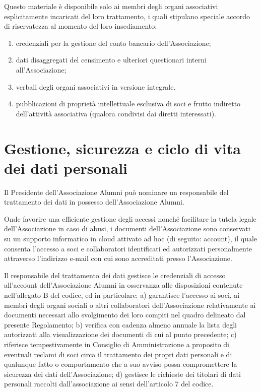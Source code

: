 Questo materiale è disponibile solo ai membri degli organi associativi
esplicitamente incaricati del loro trattamento, i quali stipulano speciale
accordo di riservatezza al momento del loro insediamento:

\begin{enumerate}
    \item credenziali per la gestione del conto bancario dell’Associazione;
    \item dati disaggregati del censimento e ulteriori questionari interni
        all’Associazione;
    \item verbali degli organi associativi in versione integrale.
    \item pubblicazioni di proprietà intellettuale esclusiva di soci e
        frutto indiretto dell’attività associativa (qualora condivisi dai
        diretti interessati).
\end{enumerate}

\section{Gestione, sicurezza e ciclo di vita dei dati personali}

Il Presidente dell’Associazione Alumni può nominare un responsabile del trattamento dei dati in possesso dell’Associazione Alumni. 

Onde favorire una efficiente gestione degli accessi nonché facilitare la tutela legale dell’Associazione in caso di abusi, i documenti dell’Associazione sono conservati su un supporto informatico in cloud attivato ad hoc (di seguito: account), il quale consenta l’accesso a soci e collaboratori identificati ed autorizzati personalmente attraverso l’indirizzo e-mail con cui sono accreditati presso l’Associazione.

Il responsabile del trattamento dei dati gestisce le credenziali di accesso all’account dell’Associazione Alumni in osservanza alle disposizioni contenute nell’allegato B del codice, ed in particolare: 
a) garantisce l’accesso ai soci, ai membri degli organi sociali o altri collaboratori dell’Associazione relativamente ai documenti necessari allo svolgimento dei loro compiti nel quadro delineato dal presente Regolamento;
b) verifica con cadenza almeno annuale la lista degli autorizzati alla visualizzazione dei documenti di cui al punto precedente;
c) riferisce tempestivamente in Consiglio di Amministrazione a proposito di eventuali reclami di soci circa il trattamento dei propri dati personali e di qualunque fatto o comportamento che a suo avviso possa compromettere la sicurezza dei dati dell’Associazione;
d) gestisce le richieste dei titolari di dati personali raccolti dall’associazione ai sensi dell’articolo 7 del codice.
 
